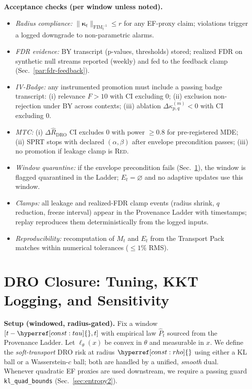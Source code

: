 \documentclass[10pt]{article}
\newcommand{\FIM}{\mathrm{FIM}}
\newcommand{\cutq}{q}
\newcommand{\constref}[1]{\hyperref[const:#1]{\ensuremath{\csname constsym#1\endcsname}}}
\begin{document}
\begin{mdframed}
\textbf{Acceptance checks (per window unless noted).}
\begin{itemize}[leftmargin=*]
\item \emph{Radius compliance:} $\|\bm\kappa_t\|_{\FIM_t^{-1}}\le r$ for any EF-proxy claim; violations trigger a logged downgrade to non-parametric alarms.
\item \emph{FDR evidence:} BY transcript (p-values, thresholds) stored; realized FDR on synthetic null streams reported (weekly) and fed to the feedback clamp (Sec.~\ref{par:fdr-feedback}).
\item \emph{IV-Badge:} any instrumented promotion must include a passing badge transcript: (i) relevance $F>10$ with CI excluding $0$; (ii) exclusion non-rejection under BY across contexts; (iii) ablation $\Delta\kappa_{p,q}^{(m)}<0$ with CI excluding $0$.
\item \emph{MTC:} (i) $\Delta\hat R_{\mathrm{DRO}}$ CI excludes $0$ with power $\ge 0.8$ for pre-registered MDE; (ii) SPRT stops with declared $(\alpha,\beta)$ after envelope precondition passes; (iii) no promotion if leakage clamp is \textsc{Red}.
\item \emph{Window quarantine:} if the envelope precondition fails (Sec.~\ref{sec:closure2}), the window is flagged \textsf{quarantined} in the Ladder; $E_t=\varnothing$ and no adaptive updates use this window.
\item \emph{Clamps:} all leakage and realized-FDR clamp events (radius shrink, $\cutq$ reduction, freeze interval) appear in the Provenance Ladder with timestamps; replay reproduces them deterministically from the logged inputs.
\item \emph{Reproducibility:} recomputation of $M_t$ and $E_t$ from the Transport Pack matches within numerical tolerances ($\le 1\%$ RMS).
\end{itemize}
\end{mdframed}

\section{DRO Closure: Tuning, KKT Logging, and Sensitivity}\label{sec:closure2}

\noindent\textbf{Setup (windowed, radius-gated).}
Fix a window $[t-\constref{tau},t]$ with empirical law $\hat P_t$ sourced from the Provenance Ladder.
Let $\ell_\theta(x)$ be convex in $\theta$ and measurable in $x$.
We define the \emph{soft-transport} DRO risk at radius $\constref{rho}$ using either a KL ball or a Wasserstein-$c$ ball; both are handled by a unified, \emph{smooth} dual.
Whenever quadratic EF proxies are used downstream, we require a passing guard \texttt{kl\_quad\_bounds} (Sec.~\ref{sec:entropy2}).
\end{document}
